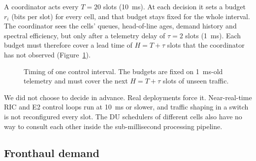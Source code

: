 A coordinator acts every $T = 20$ slots (10~ms). At each decision it sets a budget $r_i$ (bits per slot) for every cell, and that budget stays fixed for the whole interval. The coordinator sees the cells' queues, head-of-line ages, demand history and spectral efficiency, but only after a telemetry delay of $\tau = 2$ slots (1~ms). Each budget must therefore cover a lead time of $H = T + \tau$ slots that the coordinator has not observed (Figure~\ref{fig:timing}).

\begin{figure}[H]
\centering
{}
\caption{Timing of one control interval. The budgets are fixed on 1~ms-old telemetry and must cover the next $H = T+\tau$ slots of unseen traffic.}
\label{fig:timing}
\end{figure}

We did not choose to decide in advance. Real deployments force it. Near-real-time RIC and E2 control loops run at 10~ms or slower, and traffic shaping in a switch is not reconfigured every slot. The DU schedulers of different cells also have no way to consult each other inside the sub-millisecond processing pipeline.

\subsection{Fronthaul demand}

